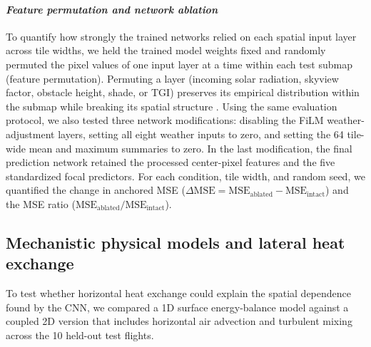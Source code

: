 \documentclass[12pt]{article}
\begin{document}
\paragraph*{\textit{Feature permutation and network ablation}}
To quantify how strongly the trained networks relied on each spatial input layer across tile widths, we held the trained model weights fixed and randomly permuted the pixel values of one input layer at a time within each test submap (feature permutation). Permuting a layer (incoming solar radiation, skyview factor, obstacle height, shade, or TGI) preserves its empirical distribution within the submap while breaking its spatial structure \citep{breiman_2001}. Using the same evaluation protocol, we also tested three network modifications: disabling the FiLM weather-adjustment layers, setting all eight weather inputs to zero, and setting the 64 tile-wide mean and maximum summaries to zero. In the last modification, the final prediction network retained the processed center-pixel features and the five standardized focal predictors. For each condition, tile width, and random seed, we quantified the change in anchored MSE ($\Delta\text{MSE} = \text{MSE}_\text{ablated} - \text{MSE}_\text{intact}$) and the MSE ratio ($\text{MSE}_\text{ablated} / \text{MSE}_\text{intact}$).

\subsection{Mechanistic physical models and lateral heat exchange}

\noindent To test whether horizontal heat exchange could explain the spatial dependence found by the CNN, we compared a 1D surface energy-balance model against a coupled 2D version that includes horizontal air advection and turbulent mixing across the 10 held-out test flights.
\end{document}
